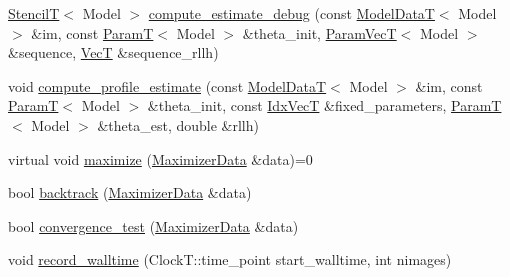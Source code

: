 \begin{DoxyCompactItemize}
\hyperlink{namespacemappel_a3a06598240007876f8c4bf834ad86197}{StencilT}$<$ Model $>$ \hyperlink{classmappel_1_1IterativeMaximizer_aa45c11a399f29985fc9bd3365e809335}{compute\+\_\+estimate\+\_\+debug} (const \hyperlink{namespacemappel_a97f050df953605381ae9c901c3b125f1}{Model\+DataT}$<$ Model $>$ \&im, const \hyperlink{namespacemappel_a667925cb0d6c0e49f2f035cc5a9a6857}{ParamT}$<$ Model $>$ \&theta\+\_\+init, \hyperlink{namespacemappel_a0f86d3153e4e27b095012f140eea58de}{Param\+VecT}$<$ Model $>$ \&sequence, \hyperlink{namespacemappel_a2225ad69f358daa3f4f99282a35b9a3a}{VecT} \&sequence\+\_\+rllh)
\item 
void \hyperlink{classmappel_1_1IterativeMaximizer_a1999fd1fa63c803b3aad87695fc82843}{compute\+\_\+profile\+\_\+estimate} (const \hyperlink{namespacemappel_a97f050df953605381ae9c901c3b125f1}{Model\+DataT}$<$ Model $>$ \&im, const \hyperlink{namespacemappel_a667925cb0d6c0e49f2f035cc5a9a6857}{ParamT}$<$ Model $>$ \&theta\+\_\+init, const \hyperlink{namespacemappel_ac63743dcd42180127307cd0e4ecdd784}{Idx\+VecT} \&fixed\+\_\+parameters, \hyperlink{namespacemappel_a667925cb0d6c0e49f2f035cc5a9a6857}{ParamT}$<$ Model $>$ \&theta\+\_\+est, double \&rllh)
\item 
virtual void \hyperlink{classmappel_1_1IterativeMaximizer_a4d05ed89de53e6e73f2f13bef30862ec}{maximize} (\hyperlink{classmappel_1_1TrustRegionMaximizer_a985b65b01842afcba340901554efa409}{Maximizer\+Data} \&data)=0
\item 
bool \hyperlink{classmappel_1_1IterativeMaximizer_ac033d2b23a6a861e6d7adbe35f17624e}{backtrack} (\hyperlink{classmappel_1_1TrustRegionMaximizer_a985b65b01842afcba340901554efa409}{Maximizer\+Data} \&data)
\item 
bool \hyperlink{classmappel_1_1IterativeMaximizer_aef9b61d66d785a1a06dd2c75c3166435}{convergence\+\_\+test} (\hyperlink{classmappel_1_1TrustRegionMaximizer_a985b65b01842afcba340901554efa409}{Maximizer\+Data} \&data)
\item 
void \hyperlink{classmappel_1_1Estimator_a50125572d3b87ebcf1ffb27a8d8c643d}{record\+\_\+walltime} (Clock\+T\+::time\+\_\+point start\+\_\+walltime, int nimages)
\end{DoxyCompactItemize}
